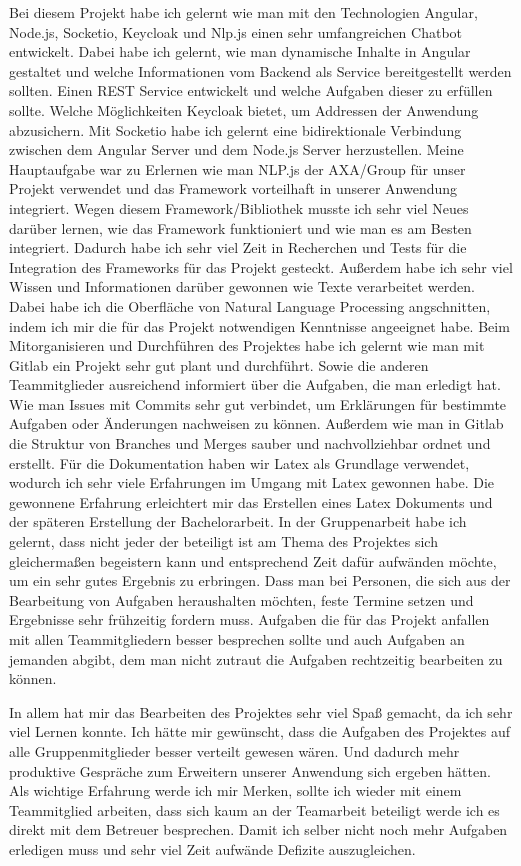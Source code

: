 \noindent Bei diesem Projekt habe ich gelernt wie man mit den Technologien Angular, Node.js, Socketio, Keycloak und Nlp.js einen sehr umfangreichen Chatbot entwickelt.
Dabei habe ich gelernt, wie man dynamische Inhalte in Angular gestaltet und welche Informationen vom Backend als Service bereitgestellt werden sollten.
Einen REST Service entwickelt und welche Aufgaben dieser zu erfüllen sollte. Welche Möglichkeiten Keycloak bietet, um Addressen der Anwendung abzusichern.
Mit Socketio habe ich gelernt eine bidirektionale Verbindung zwischen dem Angular Server und dem Node.js Server herzustellen.
Meine Hauptaufgabe war zu Erlernen wie man NLP.js der AXA/Group für unser Projekt verwendet und das Framework vorteilhaft in unserer Anwendung integriert.
Wegen diesem Framework/Bibliothek musste ich sehr viel Neues darüber lernen, wie das Framework funktioniert und wie man es am Besten integriert.
Dadurch habe ich sehr viel Zeit in Recherchen und Tests für die Integration des Frameworks für das Projekt gesteckt.
Außerdem habe ich sehr viel Wissen und Informationen darüber gewonnen wie Texte verarbeitet werden.
Dabei habe ich die Oberfläche von Natural Language Processing angschnitten, indem ich mir die für das Projekt notwendigen Kenntnisse angeeignet habe.
Beim Mitorganisieren und Durchführen des Projektes habe ich gelernt wie man mit Gitlab ein Projekt sehr gut plant und durchführt.
Sowie die anderen Teammitglieder ausreichend informiert über die Aufgaben, die man erledigt hat. Wie man Issues mit Commits sehr gut verbindet,
um Erklärungen für bestimmte Aufgaben oder Änderungen nachweisen zu können.
Außerdem wie man in Gitlab die Struktur von Branches und Merges sauber und nachvollziehbar ordnet und erstellt.
Für die Dokumentation haben wir Latex als Grundlage verwendet,
wodurch ich sehr viele Erfahrungen im Umgang mit Latex gewonnen habe.
Die gewonnene Erfahrung erleichtert mir das Erstellen eines Latex Dokuments und der späteren Erstellung der Bachelorarbeit.
In der Gruppenarbeit habe ich gelernt, dass nicht jeder der beteiligt ist am Thema des Projektes sich gleichermaßen begeistern kann und entsprechend Zeit dafür aufwänden möchte,
um ein sehr gutes Ergebnis zu erbringen. Dass man bei Personen, die sich aus der Bearbeitung von Aufgaben heraushalten möchten,
feste Termine setzen und Ergebnisse sehr frühzeitig fordern muss.
Aufgaben die für das Projekt anfallen mit allen Teammitgliedern besser besprechen sollte und auch Aufgaben an jemanden abgibt,
dem man nicht zutraut die Aufgaben rechtzeitig bearbeiten zu können.

\noindent In allem hat mir das Bearbeiten des Projektes sehr viel Spaß gemacht, da ich sehr viel Lernen konnte.
Ich hätte mir gewünscht, dass die Aufgaben des Projektes auf alle Gruppenmitglieder besser verteilt gewesen wären.
Und dadurch mehr produktive Gespräche zum Erweitern unserer Anwendung sich ergeben hätten. 
Als wichtige Erfahrung werde ich mir Merken, sollte ich wieder mit einem Teammitglied arbeiten, 
dass sich kaum an der Teamarbeit beteiligt werde ich es direkt mit dem Betreuer besprechen.
Damit ich selber nicht noch mehr Aufgaben erledigen muss und sehr viel Zeit aufwände Defizite auszugleichen.